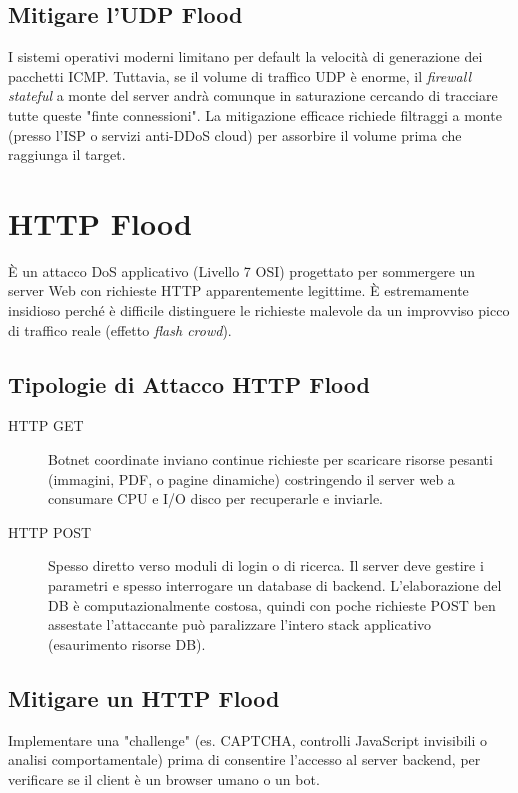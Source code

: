 \subsection{Mitigare l'UDP Flood}
I sistemi operativi moderni limitano per default la velocità di generazione dei pacchetti ICMP. Tuttavia, se il volume di traffico UDP è enorme, il \textit{firewall stateful} a monte del server andrà comunque in saturazione cercando di tracciare tutte queste "finte connessioni". La mitigazione efficace richiede filtraggi a monte (presso l'ISP o servizi anti-DDoS cloud) per assorbire il volume prima che raggiunga il target.

\section{HTTP Flood}

\begin{warnbox}
È un attacco DoS applicativo (Livello 7 OSI) progettato per sommergere un server Web con richieste HTTP apparentemente legittime. È estremamente insidioso perché è difficile distinguere le richieste malevole da un improvviso picco di traffico reale (effetto \textit{flash crowd}).
\end{warnbox}

\subsection{Tipologie di Attacco HTTP Flood}
\begin{description}
    \item[HTTP GET] Botnet coordinate inviano continue richieste per scaricare risorse pesanti (immagini, PDF, o pagine dinamiche) costringendo il server web a consumare CPU e I/O disco per recuperarle e inviarle.
    \item[HTTP POST] Spesso diretto verso moduli di login o di ricerca. Il server deve gestire i parametri e spesso interrogare un database di backend. L'elaborazione del DB è computazionalmente costosa, quindi con poche richieste POST ben assestate l'attaccante può paralizzare l'intero stack applicativo (esaurimento risorse DB).
\end{description}

\subsection{Mitigare un HTTP Flood}
Implementare una "challenge" (es. CAPTCHA, controlli JavaScript invisibili o analisi comportamentale) prima di consentire l'accesso al server backend, per verificare se il client è un browser umano o un bot.

